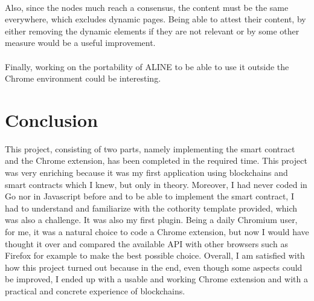 \paragraph{}
Also, since the nodes much reach a consensus, the content must be the same everywhere, which excludes dynamic pages. Being able to attest their content, by either removing the dynamic elements if they are not relevant or by some other measure would be a useful improvement.

\paragraph{}
Finally, working on the portability of ALINE to be able to use it outside the Chrome environment could be interesting.

\paragraph{}

\section{Conclusion}

This project, consisting of two parts, namely implementing the smart contract and the Chrome extension, has been completed in the required time. This project was very enriching because it was my first application using blockchains and smart contracts which I knew, but only in theory. Moreover, I had never coded in Go nor in Javascript before and to be able to implement the smart contract, I had to understand and familiarize with the cothority template provided, which was also a challenge. It was also my first plugin. Being a daily Chromium user, for me, it was a natural choice to code a Chrome extension, but now I would have thought it over and compared the available API with other browsers such as Firefox for example to make the best possible choice. Overall, I am satisfied with how this project turned out because in the end, even though some aspects could be improved, I ended up with a usable and working Chrome extension and with a practical and concrete experience of blockchains.